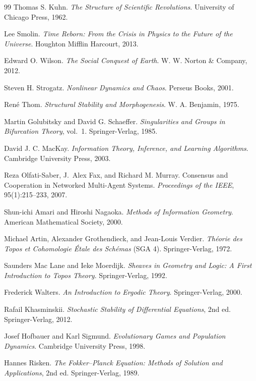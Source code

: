 \documentclass[12pt]{article}
\begin{document}
\begin{thebibliography}{99}
Thomas S. Kuhn.
\textit{The Structure of Scientific Revolutions}.
University of Chicago Press, 1962.

Lee Smolin.
\textit{Time Reborn: From the Crisis in Physics to the Future of the Universe}.
Houghton Mifflin Harcourt, 2013.

Edward O. Wilson.
\textit{The Social Conquest of Earth}.
W. W. Norton \& Company, 2012.

Steven H. Strogatz.
\textit{Nonlinear Dynamics and Chaos}.
Perseus Books, 2001.

René Thom.
\textit{Structural Stability and Morphogenesis}.
W. A. Benjamin, 1975.

Martin Golubitsky and David G. Schaeffer.
\textit{Singularities and Groups in Bifurcation Theory}, vol.~1.
Springer-Verlag, 1985.

David J. C. MacKay.
\textit{Information Theory, Inference, and Learning Algorithms}.
Cambridge University Press, 2003.

Reza Olfati-Saber, J.~Alex Fax, and Richard M. Murray.
Consensus and Cooperation in Networked Multi-Agent Systems.
\textit{Proceedings of the IEEE}, 95(1):215--233, 2007.

Shun-ichi Amari and Hiroshi Nagaoka.
\textit{Methods of Information Geometry}.
American Mathematical Society, 2000.

Michael Artin, Alexander Grothendieck, and Jean-Louis Verdier.
\textit{Théorie des Topos et Cohomologie Étale des Schémas} (SGA 4).
Springer-Verlag, 1972.

Saunders Mac Lane and Ieke Moerdijk.
\textit{Sheaves in Geometry and Logic: A First Introduction to Topos Theory}.
Springer-Verlag, 1992.

Frederick Walters.
\textit{An Introduction to Ergodic Theory}.
Springer-Verlag, 2000.

Rafail Khasminskii.
\textit{Stochastic Stability of Differential Equations}, 2nd ed.
Springer-Verlag, 2012.

Josef Hofbauer and Karl Sigmund.
\textit{Evolutionary Games and Population Dynamics}.
Cambridge University Press, 1998.

Hannes Risken.
\textit{The Fokker--Planck Equation: Methods of Solution and Applications}, 2nd ed.
Springer-Verlag, 1989.

\end{thebibliography}
\end{document}

